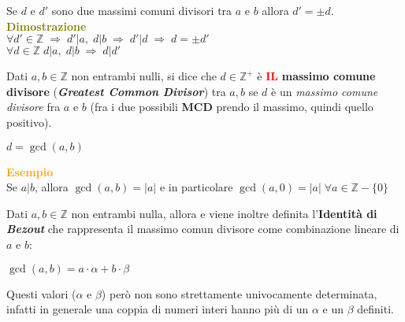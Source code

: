 \begin{boxA}
    Se $d$ e $d'$ sono due massimi comuni divisori tra $a$ e $b$ allora $d' = \pm d$. \\ \newline
    \textcolor{olive}{\textbf{Dimostrazione}} \\
    $\forall d' \in \mathbb{Z} \; \Rightarrow \; d'|a, \; d|b \; \Rightarrow \; d'|d \; \Rightarrow \; d=\pm d'$ \\
    $\forall d \in \mathbb{Z} \; d|a, \; d|b \; \Rightarrow \; d|d'$
\end{boxA}
Dati $a, b \in \mathbb{Z}$ non entrambi nulli, si dice che $d \in \mathbb{Z}^+$ è \textcolor{red}{\textbf{IL}} \textbf{massimo comune divisore} (\textbf{\textit{Greatest Common Divisor}}) tra $a,b$ se $d$ è un \textit{massimo comune divisore} fra $a$ e $b$ (fra i due possibili \textbf{MCD} prendo il massimo, quindi quello positivo).

{\centering
    $d = \gcd(a, b)$
\par}

\begin{boxA}
    \textcolor{orange}{\textbf{Esempio}} \\
    Se $a|b$, allora $\gcd(a, b) = |a|$ e in particolare $\gcd(a, 0) = |a| \; \forall a \in \mathbb{Z} - \{0\}$
\end{boxA}

Dati $a, b \in \mathbb{Z}$ non entrambi nulla, allora  e viene inoltre definita l'\textbf{Identità di \textit{Bezout}} che rappresenta il massimo comun divisore come combinazione lineare di $a$ e $b$:

{\centering
    $\gcd(a, b) = a \cdot \alpha + b \cdot \beta$
\par}

Questi valori ($\alpha$ e $\beta$) però non sono strettamente univocamente determinata, infatti in generale una coppia di numeri interi hanno più di un $\alpha$ e un $\beta$ definiti.

